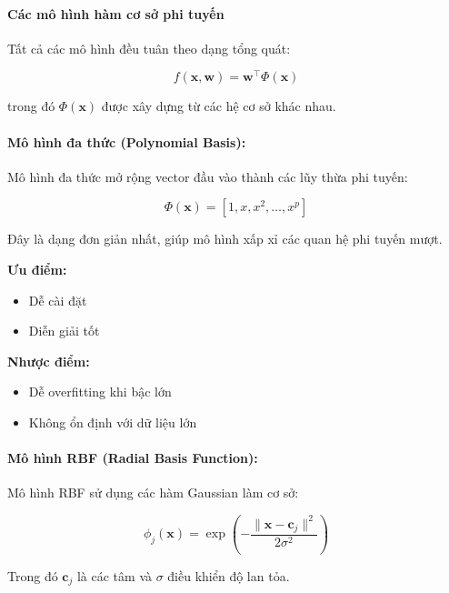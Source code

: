 \paragraph{Các mô hình hàm cơ sở phi tuyến}

Tất cả các mô hình đều tuân theo dạng tổng quát:

\begin{equation}
f(\boldsymbol{x}, \boldsymbol{w}) = \boldsymbol{w}^\intercal \Phi(\boldsymbol{x})
\end{equation}

trong đó $\Phi(\boldsymbol{x})$ được xây dựng từ các hệ cơ sở khác nhau.

\paragraph{Mô hình đa thức (Polynomial Basis):}
Mô hình đa thức mở rộng vector đầu vào thành các lũy thừa phi tuyến:

\begin{equation}
\Phi(\boldsymbol{x}) = [1, x, x^2, \dots, x^p]
\end{equation}

Đây là dạng đơn giản nhất, giúp mô hình xấp xỉ các quan hệ phi tuyến mượt.

\textbf{Ưu điểm:}
\begin{itemize}
    \item Dễ cài đặt
    \item Diễn giải tốt
\end{itemize}

\textbf{Nhược điểm:}
\begin{itemize}
    \item Dễ overfitting khi bậc lớn
    \item Không ổn định với dữ liệu lớn
\end{itemize}

\paragraph{Mô hình RBF (Radial Basis Function):}
Mô hình RBF sử dụng các hàm Gaussian làm cơ sở:

\begin{equation}
\phi_j(\boldsymbol{x}) =
\exp\left(-\frac{\|\boldsymbol{x} - \boldsymbol{c}_j\|^2}{2\sigma^2}\right)
\end{equation}

Trong đó $\boldsymbol{c}_j$ là các tâm và $\sigma$ điều khiển độ lan tỏa.

